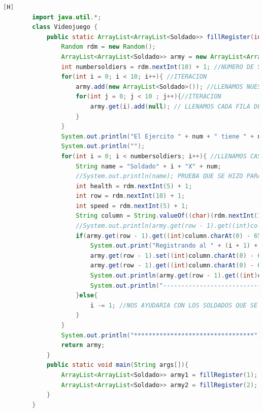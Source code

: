 \documentclass{article}
\begin{document}
	\begin{lstlisting}[language=java,caption={Las lineas de codigos del metodo creado:}][H]
		import java.util.*;
		class Videojuego { 
			public static ArrayList<ArrayList<Soldado>> fillRegister(int num){
				Random rdm = new Random();
				ArrayList<ArrayList<Soldado>> army = new ArrayList<ArrayList<Soldado>>();
				int numbersoldiers = rdm.nextInt(10) + 1; //NUMERO DE SOLDADOS ALEATORIOS ENTRE 1 A 10 SOLDADOS 
				for(int i = 0; i < 10; i++){ //ITERACION
					army.add(new ArrayList<Soldado>()); //LLENAMOS NUESTROS ARRAYLIST BIDIMENSIONAL CON CADA FILA PARA QUE CUMPLAN CON ESTRUCTURA DEL TABLERO
					for(int j = 0; j < 10 ; j++){//ITERACION
						army.get(i).add(null); // LLENAMOS CADA FILA DEL ARRAYLIST CON UN OBJETO SOLDADO CON TAL QUE ESTE SEA NULL PARA QUE SEPA QUE ESTE TIENE UNA CASILLA PERO NO HAY NADIE TODAVIA SE PUEDE LLENAR 
					}
				}
				System.out.println("El Ejercito " + num + " tiene " + numbersoldiers + " soldados : " ); 
				System.out.println("");
				for(int i = 0; i < numbersoldiers; i++){ //LLENAMOS CASILLAS CON CADA SOLDADO CREADO ALEATORIAMENTE
					String name = "Soldado" + i + "X" + num;
					//System.out.println(name); PRUEBA QUE SE HIZO PARA VER LOS NOMBRES
					int health = rdm.nextInt(5) + 1;
					int row = rdm.nextInt(10) + 1;
					int speed = rdm.nextInt(5) + 1;
					String column = String.valueOf((char)(rdm.nextInt(10) + 65)); //REUTILIZAMOS CODIGO DEL ANTERIOR ARCHIVO VIDEOJUEGO2.JAVA YA QUE TENDRIAN LA MISMA FUNCIONALIDAD
					//System.out.println(army.get(row - 1).get((int)column.charAt(0) - 65)); PRUEBA QUE SE HIZO PARA COMPROBAR SI EL OBJETO SE ESTABA DANDO O NO CAPAZ NI EXISTIA  
					if(army.get(row - 1).get((int)column.charAt(0) - 65) == null){
						System.out.print("Registrando al " + (i + 1) + " soldado del Ejercito " + num + "");
						army.get(row - 1).set((int)column.charAt(0) - 65, new Soldado(name, health, row, column));
						army.get(row - 1).get((int)column.charAt(0) - 65).setSpeed(speed);
						System.out.println(army.get(row - 1).get((int)column.charAt(0) - 65).toString());
						System.out.println("---------------------------------");
					}else{
						i -= 1; //NOS AYUDARIA CON LOS SOLDADOS QUE SE REPITEN EN EL MISMO CASILLERO CON TAL QUE NO DEBERIA CONTAR 
					}
				}
				System.out.println("*********************************");
				return army;
			}
			public static void main(String args[]){
				ArrayList<ArrayList<Soldado>> army1 = fillRegister(1);
				ArrayList<ArrayList<Soldado>> army2 = fillRegister(2);
			}
		}

	\end{lstlisting}
\end{document}
